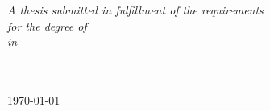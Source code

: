 \documentclass[
11pt, 
english,
singlespacing,
parskip,
headsepline,
]{MastersDoctoralThesis}
\begin{document}
\begin{titlepage}
\begin{center}
\vfill

\large \textit{A thesis submitted in fulfillment of the requirements\\ for the degree of
\degreename}\\[0.3cm]
\textit{in}\\[0.4cm]
\groupname\\\deptname\\[2cm]
 
\vfill

{\addressname \text{, } \large \today}\\[4cm]
 
\vfill
\end{center}
\end{titlepage}

\end{document}
